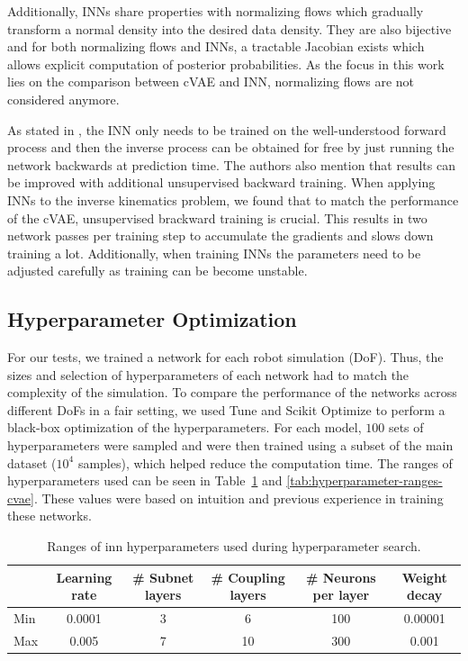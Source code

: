 \documentclass[conference]{IEEEtran}
\begin{document}
Additionally, INNs share properties with normalizing flows \cite{normalizingFlows2010, normalizingFlows2013} which gradually transform a normal density into the desired data density. They are also bijective and for both normalizing flows and INNs, a tractable Jacobian exists which allows explicit computation of posterior probabilities. As the focus in this work lies on the comparison between cVAE and INN, normalizing flows are not considered anymore.

As stated in \cite{Ardizzone2018}, the INN only needs to be trained on the well-understood forward process and then the inverse process can be obtained for free by just running the network backwards at prediction time. The authors also mention that results can be improved with additional unsupervised backward training. When applying INNs to the inverse kinematics problem, we found that to match the performance of the cVAE, unsupervised brackward training is crucial. This results in two network passes per training step to accumulate the gradients and slows down training a lot. Additionally, when training INNs the parameters need to be adjusted carefully as training can be become unstable.

\subsection*{Hyperparameter Optimization}

For our tests, we trained a network for each robot simulation (DoF). Thus, the sizes and selection of hyperparameters of each network had to match the complexity of the simulation. To compare the performance of the networks across different DoFs in a fair setting, we used Tune \cite{liaw2018tune} and Scikit Optimize \cite{scikit-optimize} to perform a black-box optimization of the hyperparameters. For each model, \(100\) sets of hyperparameters were sampled and were then trained using a subset of the main dataset (\( 10^4 \) samples), which helped reduce the computation time. The ranges of hyperparameters used can be seen in Table~\ref{tab:hyperparameter-ranges-inn} and \ref{tab:hyperparameter-ranges-cvae}. These values were based on intuition and previous experience in training these networks.

\begin{table}[h]
    \caption{Ranges of inn hyperparameters used during hyperparameter search.}
    \label{tab:hyperparameter-ranges-inn}
    \centering
    \begin{tabular}{|l|c|c|c|c|c|}
    \hline
      & Learning rate & \# Subnet layers & \# Coupling layers & \# Neurons per layer & Weight decay \\
     \hline
     Min  & 0.0001 & 3 & 6 & 100 & 0.00001 \\
     Max  & 0.005 & 7 & 10 & 300 & 0.001 \\
     \hline
    \end{tabular}
\end{table}
\end{document}
